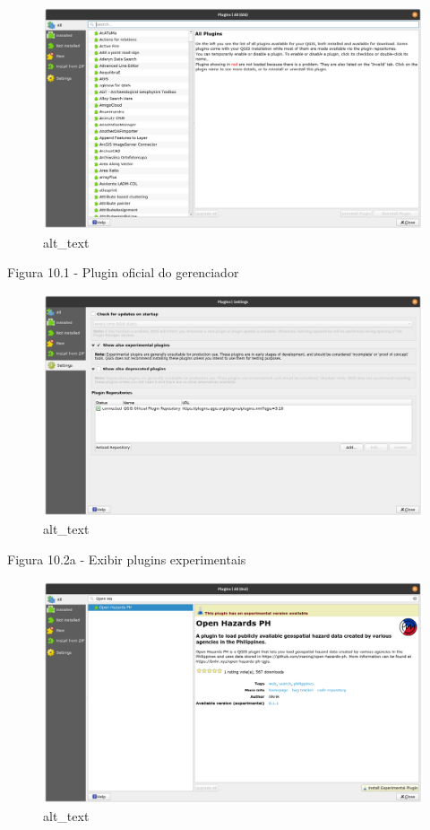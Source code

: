 \documentclass[
]{book}
\begin{document}
\begin{figure}
\centering
\includegraphics{media/modulo10/fig101.png}
\caption{alt\_text}
\end{figure}

Figura 10.1 - Plugin oficial do gerenciador

\begin{figure}
\centering
\includegraphics{media/modulo10/fig102_a.png}
\caption{alt\_text}
\end{figure}

Figura 10.2a - Exibir plugins experimentais

\begin{figure}
\centering
\includegraphics{media/modulo10/fig102_b.png}
\caption{alt\_text}
\end{figure}
\end{document}
